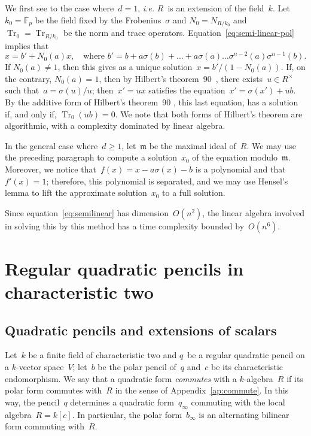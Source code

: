 \documentclass{lms}
\let\fr\mathfrak
\DeclareMathOperator\Tr{Tr}
\def\F{\mathbb{F}}
\begin{document}
We first see to the case where~$d = 1$, \emph{i.e.} $R$~is an extension
of the field~$k$. Let~$k_0 = \F_p$ be the field fixed by the
Frobenius~$σ$ and $N_0 = N_{R/k_0}$ and~$\Tr_0 = \Tr_{R/k_0}$ be the
norm and trace operators. Equation~\eqref{eq:semi-linear-pol} implies
that
\begin{equation}
x = b' + N_0(a) x, \quad\text{where $b' = b + a σ(b) + … + a σ(a) …
σ^{n-2}(a) σ^{n-1}(b)$.}
\end{equation}
If $N_0(a) ≠ 1$, then this gives as a unique solution~$x =
b'/(1-N_0(a))$. If, on the contrary, $N_0(a) = 1$, then by
Hilbert's theorem~90~\cite[VI.6.1]{lang-algebra3},
there exists~$u ∈ R^{×}$ such that~$a = σ(u)/u$;
then~$x' = ux$ satisfies the equation~$x' = σ(x') + ub$.
By the additive form of Hilbert's theorem~90 \cite[VI.6.3]{lang-algebra3},
this last equation, has a solution if, and only if, $\Tr_0 (ub) = 0$.
We note that both forms of Hilbert's theorem are algorithmic,
with a complexity dominated by linear algebra.

In the general case where~$d ≥ 1$, let~$\fr m$ be the maximal ideal
of~$R$. We may use the preceding paragraph to compute a solution~$x_0$ of
the equation modulo~$\fr m$. Moreover, we notice that~$f(x) = x -  a σ(x)
- b$ is a polynomial and that~$f'(x) = 1$; therefore, this polynomial is
separated, and we may use Hensel's lemma to lift the approximate
solution~$x_0$ to a full solution.

\medskip
Since equation~\eqref{eq:semilinear} has dimension~$O(n^2)$,
the linear algebra involved in solving this by this method
has a time complexity bounded by~$O(n^6)$.

\section{Regular quadratic pencils in characteristic two}
\label{S:quad-reg}
\subsection{Quadratic pencils and extensions of scalars}
Let~$k$ be a finite field of characteristic two and $q$~be a regular
quadratic pencil on a $k$-vector space~$V$;
let~$b$ be the polar pencil of~$q$ and~$c$ be its characteristic endomorphism.
We say that a quadratic form \emph{commutes} with a $k$-algebra~$R$ if
its polar form commutes with~$R$ in the sense of
Appendix~\ref{ap:commute}.
In this way, the pencil~$q$ determines a quadratic form~$q_{∞}$
commuting with the local algebra~$R = k[c]$.
In particular, the polar form~$b_{∞}$ is an alternating bilinear form
commuting with~$R$.
\end{document}
